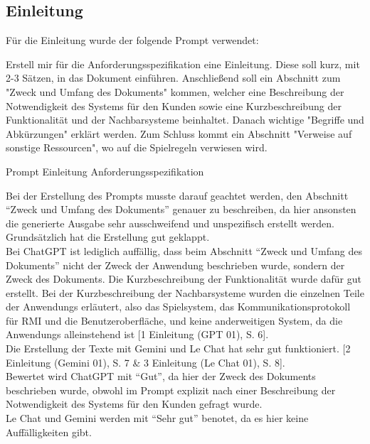 \subsection*{Einleitung}

Für die Einleitung wurde der folgende Prompt verwendet:

\begin{prompt}[H]
    \begin{tcolorbox}[colback=gray!20, colframe=gray!20, boxrule=0pt, sharp corners] 
        Erstell mir für die Anforderungsspezifikation eine Einleitung. Diese soll kurz, mit 2-3 Sätzen, in das Dokument einführen. Anschließend soll 
        ein Abschnitt zum "Zweck und Umfang des Dokuments" kommen, welcher eine Beschreibung der Notwendigkeit des Systems für den Kunden sowie eine 
        Kurzbeschreibung der Funktionalität und der Nachbarsysteme beinhaltet. Danach wichtige "Begriffe und Abkürzungen" erklärt werden. Zum Schluss 
        kommt ein Abschnitt "Verweise auf sonstige Ressourcen", wo auf die Spielregeln verwiesen wird.
        \vfill
    \end{tcolorbox}
    \caption{Prompt Einleitung Anforderungsspezifikation}
    \label{Prompt Einleitung Anforderungsspezifikation}
\end{prompt}

Bei der Erstellung des Prompts musste darauf geachtet werden, den Abschnitt ``Zweck und Umfang des Dokuments'' genauer zu beschreiben, da hier ansonsten
die generierte Ausgabe sehr ausschweifend und unspezifisch erstellt werden. Grundsätzlich hat die Erstellung gut geklappt.\\

Bei ChatGPT ist lediglich auffällig, dass beim Abschnitt ``Zweck und Umfang des Dokuments'' nicht der Zweck der Anwendung beschrieben wurde, sondern der Zweck 
des Dokuments. Die Kurzbeschreibung der Funktionalität wurde dafür gut erstellt. Bei der Kurzbeschreibung der Nachbarsysteme wurden die einzelnen Teile 
der Anwendungs erläutert, also das Spielsystem, das Kommunikationsprotokoll für RMI und die Benutzeroberfläche, und keine anderweitigen System, da die 
Anwendungs alleinstehend ist [1 Einleitung (GPT 01), S. 6].\\

Die Erstellung der Texte mit Gemini und Le Chat hat sehr gut funktioniert. [2 Einleitung (Gemini 01), S. 7 \& 3 Einleitung (Le Chat 01), S. 8].\\

Bewertet wird ChatGPT mit ``Gut'', da hier der Zweck des Dokuments beschrieben wurde, obwohl im Prompt explizit nach einer Beschreibung der Notwendigkeit
des Systems für den Kunden gefragt wurde.\\
Le Chat und Gemini werden mit ``Sehr gut'' benotet, da es hier keine Auffälligkeiten gibt.

